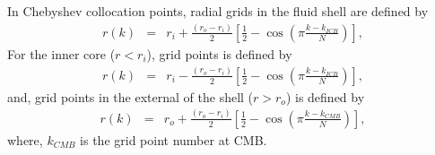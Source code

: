 In Chebyshev collocation points, radial grids in the fluid shell are defined by
%
\begin{eqnarray}
r(k) & = & r_{i} + \frac{\left(r_{o}-r_{i} \right)}{2} \left[ \frac{1}{2} - \cos \left(\pi \frac{ k-k_{ICB}}{N} \right) \right],
\nonumber
\end{eqnarray}
%
For the inner core ($r<r_{i}$), grid points is defined by
%
\begin{eqnarray}
r(k) & = & r_{i} - \frac{\left(r_{o}-r_{i} \right)}{2} \left[ \frac{1}{2} - \cos \left(\pi \frac{ k-k_{ICB}}{N} \right) \right],
\nonumber
\end{eqnarray}
%
and, grid points in the external of the shell ($r>r_{o}$) is defined by
%
\begin{eqnarray}
r(k) & = & r_{o} + \frac{\left(r_{o}-r_{i} \right)}{2} \left[ \frac{1}{2} - \cos \left(\pi \frac{ k-k_{CMB}}{N} \right) \right],
\nonumber
\end{eqnarray}
%
where, $k_{CMB}$ is the grid point number at CMB.

